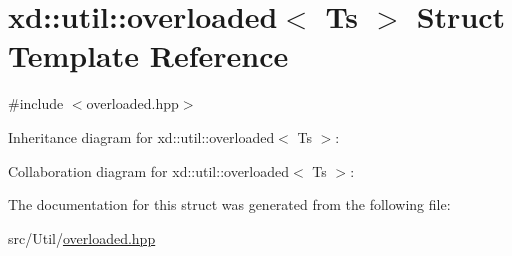 \hypertarget{structxd_1_1util_1_1overloaded}{}\section{xd\+:\+:util\+:\+:overloaded$<$ Ts $>$ Struct Template Reference}
\label{structxd_1_1util_1_1overloaded}


{\ttfamily \#include $<$overloaded.\+hpp$>$}



Inheritance diagram for xd\+:\+:util\+:\+:overloaded$<$ Ts $>$\+:


Collaboration diagram for xd\+:\+:util\+:\+:overloaded$<$ Ts $>$\+:


The documentation for this struct was generated from the following file\+:\begin{DoxyCompactItemize}
\item 
src/\+Util/\mbox{\hyperlink{overloaded_8hpp}{overloaded.\+hpp}}\end{DoxyCompactItemize}
